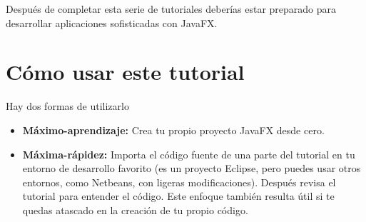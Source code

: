 Después de completar esta serie de tutoriales deberías estar preparado para desarrollar aplicaciones sofisticadas con JavaFX.
\section{Cómo usar este tutorial}
Hay dos formas de utilizarlo
\begin{itemize}
	\item \textbf{Máximo-aprendizaje:} Crea tu propio proyecto JavaFX desde cero.
	\item \textbf{Máxima-rápidez:} Importa el código fuente de una parte del tutorial en tu entorno de desarrollo favorito (es un proyecto Eclipse, pero puedes usar otros entornos, como Netbeans, con ligeras modificaciones). Después revisa el tutorial para entender el código. Este enfoque también resulta útil si te quedas atascado en la creación de tu propio código.
\end{itemize}
